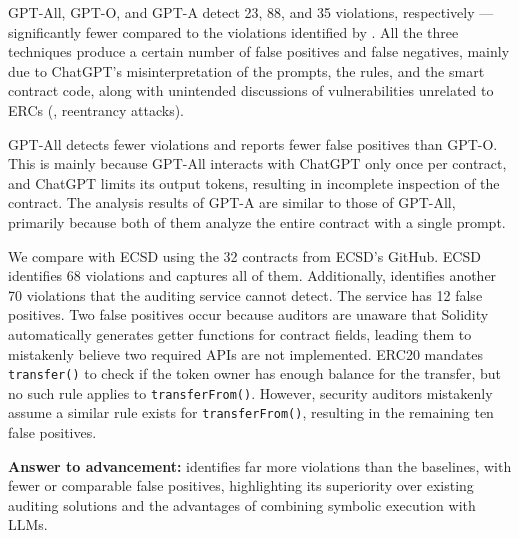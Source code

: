 \fi


GPT-All, GPT-O, and GPT-A detect 23, 88, and 35 violations, respectively --- 
significantly fewer compared to the violations identified by \Tool{}. 
All the three techniques produce a certain number of false positives 
and false negatives,  mainly due to ChatGPT’s misinterpretation of the prompts, 
the rules, and the smart contract code, along with 
unintended discussions of vulnerabilities unrelated to ERCs 
(\eg, reentrancy attacks). 






GPT-All detects fewer violations and reports fewer false 
positives than GPT-O. 
This is mainly because GPT-All interacts with 
ChatGPT only once per contract, and ChatGPT limits its 
output tokens, resulting in incomplete inspection of the 
contract. 
The analysis results of GPT-A are similar to those of GPT-All, primarily because both of them 
analyze the entire contract with a single prompt.

\fi

We compare \Tool{} with ECSD using the 32 contracts from ECSD's GitHub.
ECSD identifies 68 violations and
\Tool captures all of them. Additionally, 
\Tool{} identifies another 70 violations that 
the auditing service cannot detect. 
The service has 12 false positives. 
Two false positives occur because auditors are unaware that Solidity automatically generates getter functions for contract fields, leading them to mistakenly believe two required APIs are not implemented. 
ERC20 mandates \texttt{transfer()} to check if the token owner 
has enough balance for the transfer, but no such rule applies to \texttt{transferFrom()}. However, security auditors mistakenly assume a similar rule exists for \texttt{transferFrom()}, resulting in the remaining ten false positives.




\begin{tcolorbox}[size=title]
{\textbf{Answer to advancement:} 
\Tool{} identifies far more violations than the baselines, 
with fewer or comparable false positives, 
highlighting its superiority over existing auditing solutions 
and the advantages of combining symbolic execution with LLMs.}
\end{tcolorbox}


